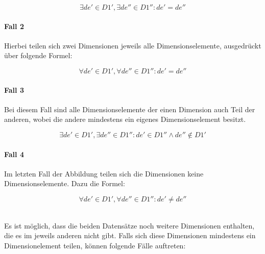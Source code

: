 \documentclass[11pt]{article}
\begin{document}
$$
    \exists de' \in D1', \exists de'' \in D1'': de' = de''
$$


%
%
\paragraph{Fall 2} Hierbei teilen sich zwei Dimensionen jeweils alle Dimensionselemente, ausgedrückt über folgende Formel:

$$
    \forall de' \in D1', \forall de'' \in D1'': de' = de''
$$


%
%
\paragraph{Fall 3} Bei diesem Fall sind alle Dimensionselemente der einen Dimension auch Teil der anderen, wobei die andere mindestens ein eigenes Dimensionselement besitzt.

$$
    \exists de' \in D1', \exists de'' \in D1'': de' \in D1'' \wedge de'' \not\in D1'
$$


%
%
\paragraph{Fall 4} Im letzten Fall der Abbildung teilen sich die Dimensionen keine Dimensionselemente. Dazu die Formel:

$$
    \forall de' \in D1', \forall de'' \in D1'': de' \neq de''
$$

\noindent
\\Es ist möglich, dass die beiden Datensätze noch weitere Dimensionen enthalten, die es im jeweils anderen nicht gibt. Falls sich diese Dimensionen mindestens ein Dimensionelement teilen, können folgende Fälle auftreten: \\
\end{document}
